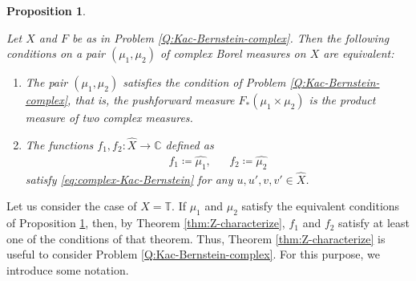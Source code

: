 \documentclass[12pt]{article}
\newtheorem{proposition}[theorem]{Proposition}
\theoremstyle{definition}
\theoremstyle{remark}
\numberwithin{equation}{section}
\numberwithin{figure}{section}
\numberwithin{table}{section}
\begin{document}
\begin{proposition}
\label{prop:Kac-Bernstein-Fourier}

Let $ X $ and $ F $ be as in Problem \ref{Q:Kac-Bernstein-complex}.
Then the following conditions on a pair $ ( \mu_1 , \mu_2 ) $ of complex Borel measures on $ X $ are equivalent:

\begin{enumerate}
  \item \label{item:Kac-Bernstein-Fourier-independent}

  The pair $ ( \mu_1 , \mu_2 ) $ satisfies the condition of Problem \ref{Q:Kac-Bernstein-complex}, that is, the pushforward measure $ F_* ( \mu_1 \times \mu_2 ) $ is the product measure of two complex measures.

  \item \label{item:Kac-Bernstein-Fourier-equation}

  The functions $ f_1 , f_2 \colon \hat{ X } \to \mathbb{ C } $ defined as
\begin{align}
    f_1 \coloneqq \hat{ \mu_1 }, & & f_2 \coloneqq \hat{ \mu_2 } \label{eq:f1-f2-Fourier}
\end{align}
satisfy \eqref{eq:complex-Kac-Bernstein} for any $ u , u' , v , v' \in \hat{ X } $.

\end{enumerate}
  
\end{proposition}

Let us consider the case of $ X = \mathbb{ T } $.
If $ \mu_1 $ and $ \mu_2 $ satisfy the equivalent conditions of Proposition \ref{prop:Kac-Bernstein-Fourier}, then, by Theorem \ref{thm:Z-characterize}, $ f_1 $ and $ f_2 $ satisfy at least one of the conditions of that theorem.
Thus, Theorem \ref{thm:Z-characterize} is useful to consider Problem \ref{Q:Kac-Bernstein-complex}.
For this purpose, we introduce some notation.
\end{document}
